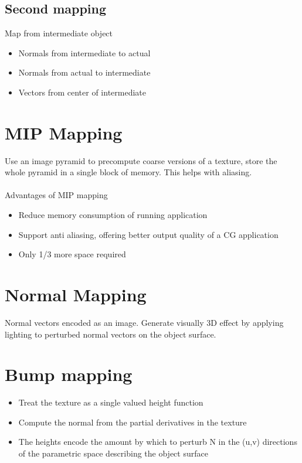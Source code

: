 \documentclass{article}[18pt]
\begin{document}
\subsection{Second mapping}
Map from intermediate object
\begin{itemize}
	\item Normals from intermediate to actual
	\item Normals from actual to intermediate
	\item Vectors from center of intermediate
\end{itemize}
\section{MIP Mapping}
Use an image pyramid to precompute coarse versions of a texture, store the whole pyramid in a single block of memory. This helps with aliasing.\\
\\
Advantages of MIP mapping
\begin{itemize}
	\item Reduce memory consumption of running application
	\item Support anti aliasing, offering better output quality of a CG application
	\item Only 1/3 more space required
\end{itemize}
\section{Normal Mapping}
Normal vectors encoded as an image. Generate visually 3D effect by applying lighting to perturbed normal vectors on the object surface.
\section{Bump mapping}
\begin{itemize}
	\item Treat the texture as a single valued height function
	\item Compute the normal from the partial derivatives in the texture
	\item The heights encode the amount by which to perturb N in the (u,v) directions of the parametric space describing the object surface
\end{itemize}
\end{document}
